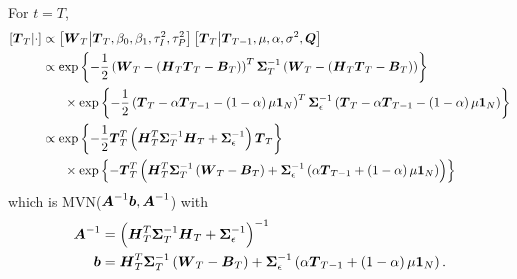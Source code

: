 \documentclass{article}\usepackage[]{graphicx}\usepackage[]{color}
\def\bm#1{\mbox{\boldmath $#1$}}
\begin{document}
%
For $t = T$,
%
\begin{align*}
%
\left[ \bm{T}_T \middle| \cdot \right] & \propto \left[ \bm{W}_T \middle| \bm{T}_T, \beta_0, \beta_1, \tau^2_I, \tau^2_P \right] \left[ \bm{T}_T \middle| \bm{T}_{T - 1}, \mu, \alpha, \sigma^2, \bm{Q} \right] \\
%
& \propto \exp{ \left\{ - \frac{1} {2} \left( \bm{W}_T - \left( \bm{H}_T \bm{T}_T - \bm{B}_T \right) \right)^T \bm{\Sigma}_T^{ - 1} \left( \bm{W}_T - \left( \bm{H}_T \bm{T}_T - \bm{B}_T \right)  \right) \right\} }\\
& \hspace{6mm} \times \exp{ \left\{ - \frac{1} {2} \left( \bm{T}_T - \alpha \bm{T}_{T - 1} - \left( 1 - \alpha \right) \mu \bm{1}_N \right)^T \bm{\Sigma}_\epsilon^{ - 1} \left( \bm{T}_T - \alpha \bm{T}_{T - 1} - \left( 1 - \alpha \right) \mu \bm{1}_N \right) \right\} }\\
%
& \propto \exp{ \left\{ - \frac{1} {2} \bm{T}_T^T \left(\bm{H}_T^T \bm{\Sigma}_T^{ - 1} \bm{H}_T +  \bm{\Sigma}_\epsilon^{ - 1} \right) \bm{T}_T \right\} }\\
& \hspace{6mm} \times \exp{ \left\{ - \bm{T}_T^T \left( \bm{H}_T^T \bm{\Sigma}_T^{ - 1} \left( \bm{W}_T - \bm{B}_T \right) + \bm{\Sigma}_\epsilon^{ - 1} \left( \alpha \bm{T}_{T - 1} + \left( 1 - \alpha \right) \mu \bm{1}_N \right) \right) \right\} }
%
\end{align*}
%
which is MVN($\bm{A}^{ - 1}\bm{b}, \bm{A}^{ - 1}$) with \\
\begin{align*}
%
\bm{A}^{ - 1} & = \left( \bm{H}_T^T \bm{\Sigma}_T^{ - 1} \bm{H}_T +  \bm{\Sigma}_\epsilon^{ - 1} \right)^{ - 1}\\
%
\bm{b} & =  \bm{H}_T^T \bm{\Sigma}_T^{ - 1} \left( \bm{W}_T - \bm{B}_T \right) + \bm{\Sigma}_\epsilon^{ - 1} \left( \alpha \bm{T}_{T - 1} + \left( 1 - \alpha \right) \mu \bm{1}_N \right).\\
%
\end{align*}
%
%
\end{document}

